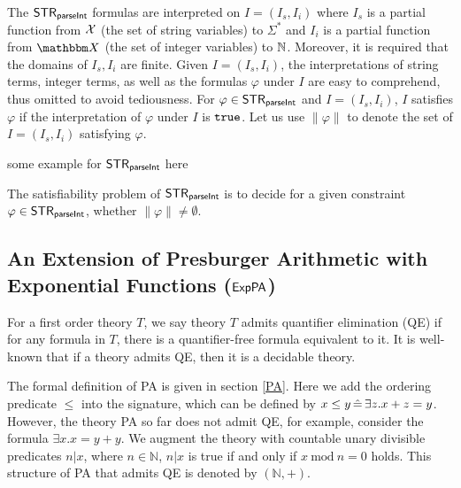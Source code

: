 The ${\sf STR}_{\textsf{parseInt}}$ formulas are interpreted on $I=(I_s, I_i)$ where $I_s$ is a partial function from $\mathcal{X}$ (the set of string variables) to $\Sigma^*$ and $I_i$ is a partial function from $\ivars$ (the set of integer variables) to $\mathbb{N}$. Moreover, it is required that the domains of $I_s, I_i$ are finite. Given $I = (I_s, I_i)$, the interpretations of string terms, integer terms, as well as the formulas $\varphi$ under $I$ are easy to comprehend, thus omitted to avoid tediousness. For $\varphi \in {\sf STR}_{\textsf{parseInt}}$ and $I = (I_s, I_i)$, $I$ satisfies $\varphi$ if the interpretation of $\varphi$ under $I$ is $\mathtt{true}$.
Let us use $\lVert \varphi \rVert$ to denote the set of $I = (I_s, I_i)$ satisfying $\varphi$.

\begin{example}
some example for ${\sf STR}_{\textsf{parseInt}}$ here
\end{example}


The satisfiability problem of ${\sf STR}_{\textsf{parseInt}}$ is to decide for a given constraint $\varphi \in {\sf STR}_{\textsf{parseInt}}$,
whether $\lVert  \varphi \rVert \neq \emptyset$.

\subsection{An Extension of Presburger Arithmetic with Exponential Functions (${\sf ExpPA}$)}


For a first order theory $T$,
we say theory $T$ admits quantifier elimination (QE) if for any formula in $T$, 
there is a quantifier-free formula equivalent to it.
It is well-known that if a theory admits QE, 
then it is a decidable theory.

The formal definition of PA is given in section \ref{PA}.
Here we add the ordering predicate $\le$ into the signature,
which can be defined by $x \le y\, \hat{=} \, \exists z. x+z=y$.
However, the theory PA so far does not admit QE, 
for example, consider the formula $\exists x.x = y + y$. 
We augment the theory with countable unary divisible predicates
$n|x$, where $n\in \mathbb{N}$, 
$n|x$ is true if and only if $x\ \text{mod}\ n=0$ holds.
This structure of PA that admits QE is denoted by $(\mathbb{N},+)$.

